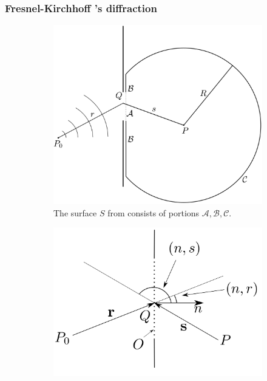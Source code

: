 \subsubsection{Fresnel-Kirchhoff ’s diffraction}

\begin{figure}
    \centering
    \newcommand*{\subfigwidth}{\linewidth}
    \begin{subfigure}[b]{\subfigwidth}
        \centering
        \includegraphics[width=\linewidth]{figures/appendix/fresnel-kirchoff.png}
        \caption{The surface \(S\) from consists of portions \(\mathcal{A}, \mathcal{B}, \mathcal{C}\).}\label{subfig:fresnelkirchoffsurf}
    \end{subfigure}
    \begin{subfigure}[b]{\subfigwidth}
        \centering
        \includegraphics[width=\linewidth]{figures/appendix/fresnelkirchoffsetup.png}

\end{subfigure}
\end{figure}
